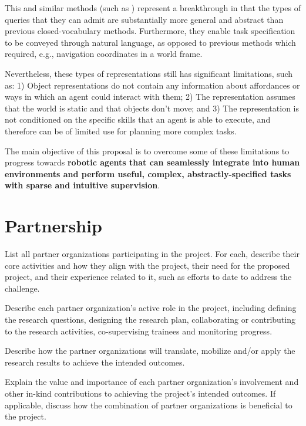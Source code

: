 \documentclass[english,
]{nserc-alliance}
\begin{document}
This and similar methods (such as \cite{HOV-SG}) represent a breakthrough in that the types of queries that they can admit are substantially more general and abstract than previous closed-vocabulary methods. Furthermore, they enable  task specification to be conveyed through natural language, as opposed to previous methods which required, e.g., navigation coordinates in a world frame.

Nevertheless, these types of representations still has significant limitations, such as: 1) Object representations do not contain any information about affordances or ways in which an agent could interact with them; 2) The representation assumes that the world is static and that objects don't move; and 3) The representation is not conditioned on the specific skills that an agent is able to execute, and therefore can be of limited use for planning more complex tasks.


The main objective of this proposal is to overcome some of these limitations to progress towards \textbf{robotic agents that can seamlessly integrate into human environments and perform useful, complex, abstractly-specified tasks with sparse and intuitive supervision}.



\section*{Partnership}
\ifinst\begin{instructions}
  \item List all partner organizations participating in the project. For each, describe their core activities and how they align with the project, their need for the proposed project, and their experience related to it, such as efforts to date to address the challenge.
  \item	Describe each partner organization's active role in the project, including defining the research questions, designing the research plan, collaborating or contributing to the research activities, co-supervising trainees and monitoring progress.
  \item Describe how the partner organizations will translate, mobilize and/or apply the research results to achieve the intended outcomes. 
  \item Explain the value and importance of each partner organization's involvement and other in-kind contributions to achieving the project's intended outcomes. If applicable, discuss how the combination of partner organizations is beneficial to the project. 
\end{instructions}\fi
  
\end{document}
